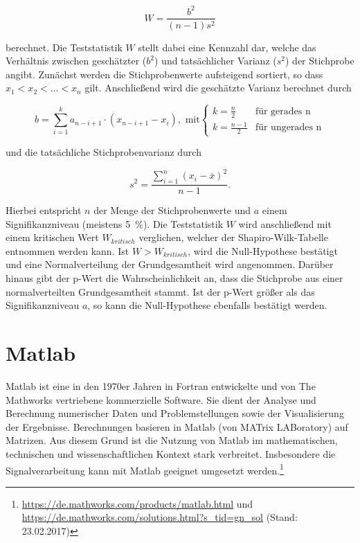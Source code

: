 \begin{equation}
W =  \frac{b^2}{(n - 1)s^2}
	\label{eq:shapiro}
\end{equation}

berechnet. Die Teststatistik $W$ stellt dabei eine Kennzahl dar, welche das Verhältnis zwischen geschätzter ($b^2$) und tatsächlicher Varianz ($s^2$) der Stichprobe angibt. Zunächst werden die Stichprobenwerte aufsteigend sortiert, so dass $x_1 < x_2 < ... < x_n$ gilt. Anschließend wird die geschätzte Varianz berechnet durch

\begin{equation}
b =  \sum \limits_{i=1}^k a_{n-i+1} \cdot (x_{n-i+1} - x_i), \text{ mit} \begin{cases}
     k = \frac{n}{2} & \text{für gerades n}\\
     k = \frac{n-1}{2} & \text{für ungerades n}
   \end{cases}
	\label{eq:var1}
\end{equation}

und die tatsächliche Stichprobenvarianz durch 

\begin{equation}
s^2 = \frac{\sum \limits_{i=1}^n (x_i - \overline{x})^2}{n - 1}.
	\label{eq:var1}
\end{equation}

Hierbei entspricht $n$ der Menge der Stichprobenwerte und $a$ einem Signifikanzniveau (meistens 5~\%). Die Teststatistik $W$ wird anschließend mit einem kritischen Wert $W_{kritisch}$ verglichen, welcher der Shapiro-Wilk-Tabelle entnommen werden kann. Ist $W > W_{kritisch}$, wird die Null-Hypothese bestätigt und eine Normalverteilung der Grundgesamtheit wird angenommen. Darüber hinaus gibt der p-Wert die Wahrscheinlichkeit an, dass die Stichprobe aus einer normalverteilten Grundgesamtheit stammt. Ist der p-Wert größer als das Signifikanzniveau $a$, so kann die Null-Hypothese ebenfalls bestätigt werden. \parencite{frank_einfach_2006, shapiro_analysis_1965}

\section{Matlab}

Matlab ist eine in den 1970er Jahren in Fortran entwickelte und von The Mathworks vertriebene kommerzielle Software. Sie dient der Analyse und Berechnung numerischer Daten und Problemstellungen sowie der Visualisierung der Ergebnisse. Berechnungen basieren in Matlab (von MATrix LABoratory) auf Matrizen. Aus diesem Grund ist die Nutzung von Matlab im mathematischen, technischen und wissenschaftlichen Kontext stark verbreitet. Insbesondere die Signalverarbeitung kann mit Matlab geeignet umgesetzt werden.\footnote{\url{https://de.mathworks.com/products/matlab.html} und \url{https://de.mathworks.com/solutions.html?s_tid=gn_sol} (Stand: 23.02.2017)}\\

